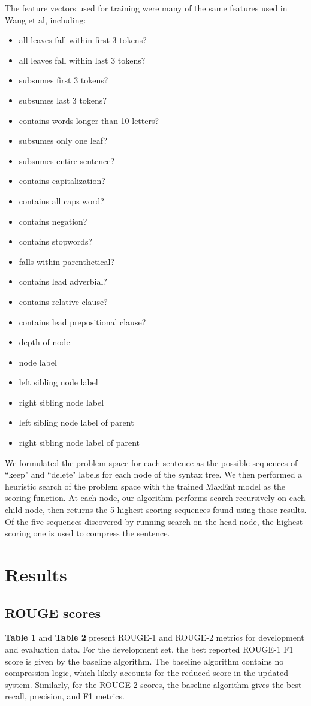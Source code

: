 \documentclass[11pt]{article}
\begin{document}
The feature vectors used for training were many of the same features used in Wang et al, including:
\begin{itemize}
\item all leaves fall within first 3 tokens?
\item all leaves fall within last 3 tokens?
\item subsumes first 3 tokens?
\item subsumes last 3 tokens?
\item contains words longer than 10 letters?
\item subsumes only one leaf?
\item subsumes entire sentence?
\item contains capitalization?
\item contains all caps word?
\item contains negation?
\item contains stopwords?
\item falls within parenthetical?
\item contains lead adverbial?
\item contains relative clause?
\item contains lead prepositional clause?
\item depth of node
\item node label
\item left sibling node label
\item right sibling node label
\item left sibling node label of parent
\item right sibling node label of parent
\end{itemize}

We formulated the problem space for each sentence as the possible sequences of ``keep" and ``delete" labels for each node of the syntax tree. We then performed a heuristic search of the problem space with the trained MaxEnt model as the scoring function. At each node, our algorithm performs search recursively on each child node, then returns the 5 highest scoring sequences found using those results. Of the five sequences discovered by running search on the head node, the highest scoring one is used to compress the sentence.

\section{Results}
\subsection{ROUGE scores}
\textbf{Table 1} and \textbf{Table 2} present ROUGE-1 and ROUGE-2 metrics for development and evaluation data. For the development set, the best reported  ROUGE-1 F1 score is given by the baseline algorithm. The baseline algorithm contains no compression logic, which likely accounts for the reduced score in the updated system. Similarly, for the ROUGE-2 scores, the baseline algorithm gives the best recall, precision, and F1 metrics.
\end{document}
